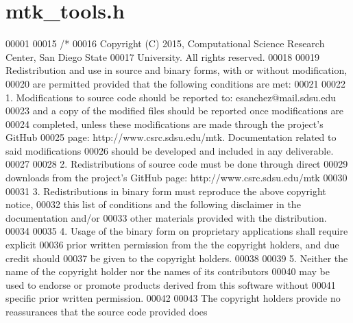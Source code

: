 \hypertarget{mtk__tools_8h_source}{\section{mtk\+\_\+tools.\+h}
\label{mtk__tools_8h_source}
}

\begin{DoxyCode}
00001 
00015 \textcolor{comment}{/*}
00016 \textcolor{comment}{Copyright (C) 2015, Computational Science Research Center, San Diego State}
00017 \textcolor{comment}{University. All rights reserved.}
00018 \textcolor{comment}{}
00019 \textcolor{comment}{Redistribution and use in source and binary forms, with or without modification,}
00020 \textcolor{comment}{are permitted provided that the following conditions are met:}
00021 \textcolor{comment}{}
00022 \textcolor{comment}{1. Modifications to source code should be reported to: esanchez@mail.sdsu.edu}
00023 \textcolor{comment}{and a copy of the modified files should be reported once modifications are}
00024 \textcolor{comment}{completed, unless these modifications are made through the project's GitHub}
00025 \textcolor{comment}{page: http://www.csrc.sdsu.edu/mtk. Documentation related to said modifications}
00026 \textcolor{comment}{should be developed and included in any deliverable.}
00027 \textcolor{comment}{}
00028 \textcolor{comment}{2. Redistributions of source code must be done through direct}
00029 \textcolor{comment}{downloads from the project's GitHub page: http://www.csrc.sdsu.edu/mtk}
00030 \textcolor{comment}{}
00031 \textcolor{comment}{3. Redistributions in binary form must reproduce the above copyright notice,}
00032 \textcolor{comment}{this list of conditions and the following disclaimer in the documentation and/or}
00033 \textcolor{comment}{other materials provided with the distribution.}
00034 \textcolor{comment}{}
00035 \textcolor{comment}{4. Usage of the binary form on proprietary applications shall require explicit}
00036 \textcolor{comment}{prior written permission from the the copyright holders, and due credit should}
00037 \textcolor{comment}{be given to the copyright holders.}
00038 \textcolor{comment}{}
00039 \textcolor{comment}{5. Neither the name of the copyright holder nor the names of its contributors}
00040 \textcolor{comment}{may be used to endorse or promote products derived from this software without}
00041 \textcolor{comment}{specific prior written permission.}
00042 \textcolor{comment}{}
00043 \textcolor{comment}{The copyright holders provide no reassurances that the source code provided does}

\end{DoxyCode}

